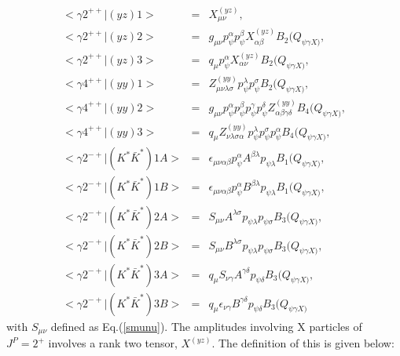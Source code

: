 \begin{eqnarray}
<\gamma 2^{++}|(yz)1>  \!&=&\! X_{\mu\nu}^{(yz)},
                \\
<\gamma 2^{++}|(yz)2>  \!&=&\!g_{\mu\nu}p_\psi^\alpha p_\psi^\beta
X_{\alpha\beta}^{(yz)}B_2(Q_{\psi\gamma X)},
                \\
<\gamma 2^{++}|(yz)3> \!&=&\! q_\mu p_\psi^\alpha
X^{(yz)}_{\alpha\nu}B_2(Q_{\psi\gamma X)},
                \\
<\gamma 4^{++}|(yy)1>  \!&=&\!
Z^{(yy)}_{\mu\nu\lambda\sigma}p_\psi^\lambda p_\psi^\sigma
B_2(Q_{\psi\gamma X)}, \\
<\gamma 4^{++}|(yy)2> \!&=&\! g_{\mu\nu}
p_\psi^{\alpha}p_\psi^{\beta}p_\psi^{\gamma}p_\psi^{\delta}
Z^{(yy)}_{\alpha\beta\gamma\delta}B_4(Q_{\psi\gamma X)}, \\
<\gamma 4^{++}|(yy)3> \!&=&\! q_\mu
Z^{(yy)}_{\nu\lambda\sigma\alpha} p_\psi^\lambda p_\psi^\sigma
p_\psi^\alpha B_4(Q_{\psi\gamma X)}, \\
<\gamma 2^{-+}|(K^*\bar K^*)1A> \!&=&\!
\epsilon_{\mu\nu\alpha\beta}p_\psi^\alpha A^{\beta\lambda}p_{\psi\lambda}B_1(Q_{\psi\gamma X)},  \\
<\gamma 2^{-+}|(K^*\bar K^*)1B> \!&=&\!
\epsilon_{\mu\nu\alpha\beta}p_\psi^\alpha B^{\beta\lambda}p_{\psi\lambda}B_1(Q_{\psi\gamma X)},  \\
<\gamma 2^{-+}|(K^*\bar K^*)2A> \!&=&\! S_{\mu\nu}
A^{\lambda\sigma}p_{\psi\lambda}p_{\psi\sigma}B_3(Q_{\psi\gamma X)},  \\
<\gamma 2^{-+}|(K^*\bar K^*)2B> \!&=&\! S_{\mu\nu}
B^{\lambda\sigma}p_{\psi\lambda}p_{\psi\sigma}B_3(Q_{\psi\gamma X)},  \\
<\gamma 2^{-+}|(K^*\bar K^*)3A> \!&=&\! q_\mu S_{\nu\gamma}
A^{\gamma\delta}p_{\psi\delta}B_3(Q_{\psi\gamma X)},  \\
<\gamma 2^{-+}|(K^*\bar K^*)3B> \!&=&\! q_\mu\epsilon_{\nu\gamma}
B^{\gamma\delta}p_{\psi\delta}B_3(Q_{\psi\gamma X)}
\end{eqnarray}
with $S_{\mu\nu}$ defined as Eq.(\ref{smunu}). The amplitudes
involving X particles of $J^{P}=2^{+}$ involves a rank two tensor,
$X^{(yz)}$. The definition of this is given below:
